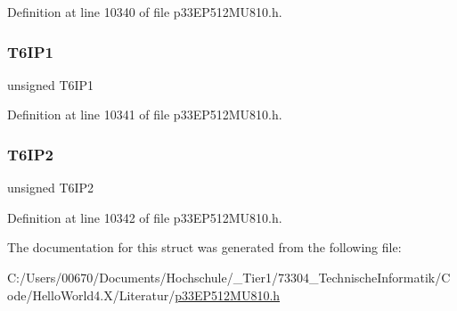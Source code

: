 Definition at line 10340 of file p33\+E\+P512\+M\+U810.\+h.

\mbox{\label{structtag_i_p_c11_b_i_t_s_a7e52c63983862ea211733625e404ae34}} 
\subsubsection{\texorpdfstring{T6\+I\+P1}{T6IP1}}
{\footnotesize\ttfamily unsigned T6\+I\+P1}



Definition at line 10341 of file p33\+E\+P512\+M\+U810.\+h.

\mbox{\label{structtag_i_p_c11_b_i_t_s_a402ec6c1a1467bd35faa306338a69082}} 
\subsubsection{\texorpdfstring{T6\+I\+P2}{T6IP2}}
{\footnotesize\ttfamily unsigned T6\+I\+P2}



Definition at line 10342 of file p33\+E\+P512\+M\+U810.\+h.



The documentation for this struct was generated from the following file\+:\begin{DoxyCompactItemize}
\item 
C\+:/\+Users/00670/\+Documents/\+Hochschule/\+\_\+\+Tier1/73304\+\_\+\+Technische\+Informatik/\+Code/\+Hello\+World4.\+X/\+Literatur/\hyperlink{p33_e_p512_m_u810_8h}{p33\+E\+P512\+M\+U810.\+h}\end{DoxyCompactItemize}
